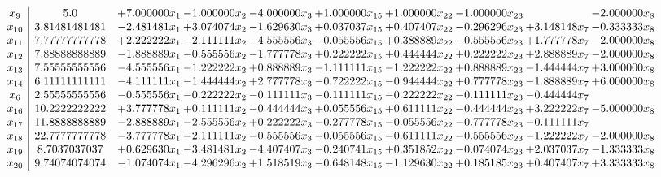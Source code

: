 \documentclass[10pt]{article}
\begin{document}
 \[\begin{array}{c| c c@{\hskip 2pt} c@{\hskip 2pt} c@{\hskip 2pt} c@{\hskip 2pt} c@{\hskip 2pt} c@{\hskip 2pt} c@{\hskip 2pt} c@{\hskip 2pt} }
 x_{9}   &  5.0 & + 7.000000 x_{1} & -1.000000 x_{2} & -4.000000 x_{3} & + 1.000000 x_{15} & + 1.000000 x_{22} & -1.000000 x_{23} &   & -2.000000 x_{8}\\
 x_{10}   &  3.81481481481 & -2.481481 x_{1} & + 3.074074 x_{2} & -1.629630 x_{3} & + 0.037037 x_{15} & + 0.407407 x_{22} & -0.296296 x_{23} & + 3.148148 x_{7} & -0.333333 x_{8}\\
 x_{11}   &  7.77777777778 & + 2.222222 x_{1} & -2.111111 x_{2} & -4.555556 x_{3} & -0.055556 x_{15} & + 0.388889 x_{22} & -0.555556 x_{23} & + 1.777778 x_{7} & -2.000000 x_{8}\\
 x_{12}   &  7.88888888889 & -1.888889 x_{1} & -0.555556 x_{2} & -1.777778 x_{3} & + 0.222222 x_{15} & + 0.444444 x_{22} & + 0.222222 x_{23} & + 2.888889 x_{7} & -2.000000 x_{8}\\
 x_{13}   &  7.55555555556 & -4.555556 x_{1} & -1.222222 x_{2} & + 0.888889 x_{3} & -1.111111 x_{15} & -1.222222 x_{22} & + 0.888889 x_{23} & -1.444444 x_{7} & + 3.000000 x_{8}\\
 x_{14}   &  6.11111111111 & -4.111111 x_{1} & -1.444444 x_{2} & + 2.777778 x_{3} & -0.722222 x_{15} & -0.944444 x_{22} & + 0.777778 x_{23} & -1.888889 x_{7} & + 6.000000 x_{8}\\
 x_{6}   &  2.55555555556 & -0.555556 x_{1} & -0.222222 x_{2} & -0.111111 x_{3} & -0.111111 x_{15} & -0.222222 x_{22} & -0.111111 x_{23} & -0.444444 x_{7} &   \\
 x_{16}   &  10.2222222222 & + 3.777778 x_{1} & + 0.111111 x_{2} & -0.444444 x_{3} & + 0.055556 x_{15} & + 0.611111 x_{22} & -0.444444 x_{23} & + 3.222222 x_{7} & -5.000000 x_{8}\\
 x_{17}   &  11.8888888889 & -2.888889 x_{1} & -2.555556 x_{2} & + 0.222222 x_{3} & -0.277778 x_{15} & -0.055556 x_{22} & -0.777778 x_{23} & -0.111111 x_{7} &   \\
 x_{18}   &  22.7777777778 & -3.777778 x_{1} & -2.111111 x_{2} & -0.555556 x_{3} & -0.055556 x_{15} & -0.611111 x_{22} & -0.555556 x_{23} & -1.222222 x_{7} & -2.000000 x_{8}\\
 x_{19}   &  8.7037037037 & + 0.629630 x_{1} & -3.481481 x_{2} & -4.407407 x_{3} & -0.240741 x_{15} & + 0.351852 x_{22} & -0.074074 x_{23} & + 2.037037 x_{7} & -1.333333 x_{8}\\
 x_{20}   &  9.74074074074 & -1.074074 x_{1} & -4.296296 x_{2} & + 1.518519 x_{3} & -0.648148 x_{15} & -1.129630 x_{22} & + 0.185185 x_{23} & + 0.407407 x_{7} & + 3.333333 x_{8}\\

\end{array}\]
\end{document}
